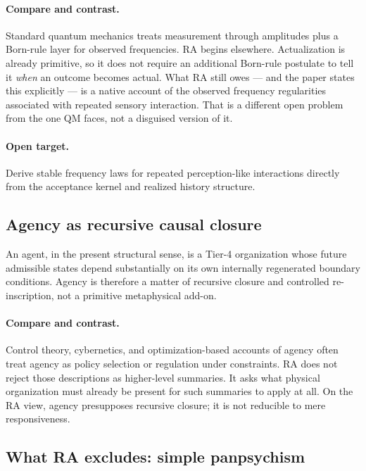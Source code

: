 \documentclass[11pt]{article}
\begin{document}
\paragraph{Compare and contrast.} Standard quantum mechanics treats measurement through amplitudes plus a Born-rule layer for observed frequencies. RA begins elsewhere. Actualization is already primitive, so it does not require an additional Born-rule postulate to tell it \emph{when} an outcome becomes actual. What RA still owes --- and the paper states this explicitly --- is a native account of the observed frequency regularities associated with repeated sensory interaction. That is a different open problem from the one QM faces, not a disguised version of it.

\paragraph{Open target.} Derive stable frequency laws for repeated perception-like interactions directly from the acceptance kernel and realized history structure.

\subsection{Agency as recursive causal closure}

An agent, in the present structural sense, is a Tier-4 organization whose future admissible states depend substantially on its own internally regenerated boundary conditions. Agency is therefore a matter of recursive closure and controlled re-inscription, not a primitive metaphysical add-on.

\paragraph{Compare and contrast.} Control theory, cybernetics, and optimization-based accounts of agency often treat agency as policy selection or regulation under constraints. RA does not reject those descriptions as higher-level summaries. It asks what physical organization must already be present for such summaries to apply at all. On the RA view, agency presupposes recursive closure; it is not reducible to mere responsiveness.

\subsection{What RA excludes: simple panpsychism}
\end{document}
